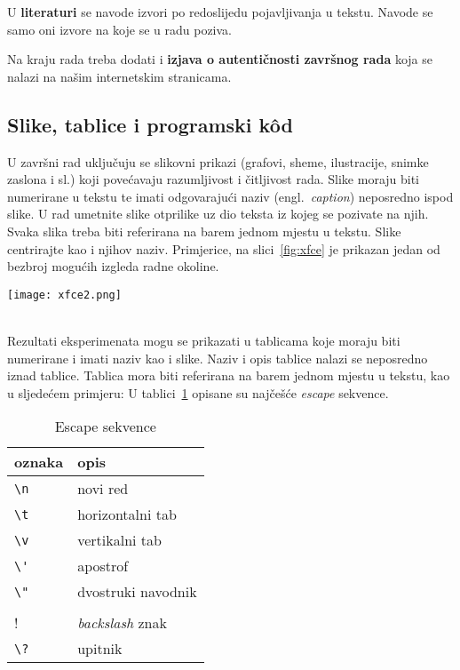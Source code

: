 U \textbf{literaturi} se navode izvori po redoslijedu pojavljivanja u tekstu. Navode se samo oni izvore na koje se u radu poziva.

Na kraju rada treba dodati i \textbf{izjava o autentičnosti završnog rada} koja se nalazi na našim internetskim stranicama.

\subsection{Slike, tablice i programski k\^od}
U završni rad uključuju se slikovni prikazi (grafovi, sheme, ilustracije, snimke zaslona i sl.) koji povećavaju razumljivost i čitljivost rada. Slike moraju biti numerirane u tekstu te imati odgovarajući naziv (engl.~\textit{caption}) neposredno ispod slike. U rad umetnite slike otprilike uz dio teksta iz kojeg se pozivate na njih. Svaka slika treba biti referirana na barem jednom mjestu u tekstu. Slike centrirajte kao i njihov naziv. Primjerice, na slici~\ref{fig:xfce} je prikazan jedan od bezbroj mogućih izgleda radne okoline.
\\[\intextsep]
\begin{minipage}{\linewidth}
\centering%
\texttt{[image: xfce2.png]}%
%
\label{fig:xfce}%
\end{minipage}
\\[\intextsep]
Rezultati eksperimenata mogu se prikazati u tablicama koje moraju biti numerirane i imati naziv kao i slike. Naziv i opis tablice nalazi se neposredno iznad tablice. Tablica mora biti referirana na barem jednom mjestu u tekstu, kao u sljedećem primjeru: U tablici~\ref{fig:ioesc} opisane su najčešće \textit{escape} sekvence.
\begin{longtable}{l l }
\caption{Escape sekvence}\label{fig:ioesc}
\endfirsthead
\endhead
\hline
oznaka&opis \\
\hline
\lstinline!\n!&novi red \\
\lstinline!\t!&horizontalni tab\\
\lstinline!\v!&vertikalni tab\\
\lstinline!\'!&apostrof \\
\lstinline!\"!&dvostruki navodnik \\
\lstinline!\\!&\textit{backslash} znak \\
\lstinline!\?!&upitnik\\
\hline
\end{longtable}

